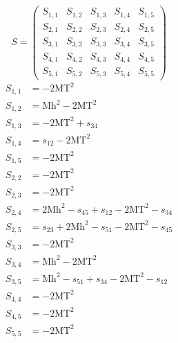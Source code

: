 \documentclass[a4paper]{article}
\begin{document}
\begin{equation}
S=\left(\begin{array}{ccccc}
   S_{1,1}&
   S_{1,2}&
   S_{1,3}&
   S_{1,4}&
   S_{1,5}\\
   S_{2,1}&
   S_{2,2}&
   S_{2,3}&
   S_{2,4}&
   S_{2,5}\\
   S_{3,1}&
   S_{3,2}&
   S_{3,3}&
   S_{3,4}&
   S_{3,5}\\
   S_{4,1}&
   S_{4,2}&
   S_{4,3}&
   S_{4,4}&
   S_{4,5}\\
   S_{5,1}&
   S_{5,2}&
   S_{5,3}&
   S_{5,4}&
   S_{5,5}\end{array}\right)
\end{equation}
\begin{subequations}
\begin{align}
   S_{1,1}&=-2\text{MT}^2\\
   S_{1,2}&=\text{Mh}^2-2\text{MT}^2\\
   S_{1,3}&=-2\text{MT}^2+s_{34}\\
   S_{1,4}&=s_{12}-2\text{MT}^2\\
   S_{1,5}&=-2\text{MT}^2\\
   S_{2,2}&=-2\text{MT}^2\\
   S_{2,3}&=-2\text{MT}^2\\
   S_{2,4}&=2\text{Mh}^2-s_{45}+s_{12}-2\text{MT}^2-s_{34}\\
   S_{2,5}&=s_{23}+2\text{Mh}^2-s_{51}-2\text{MT}^2-s_{45}\\
   S_{3,3}&=-2\text{MT}^2\\
   S_{3,4}&=\text{Mh}^2-2\text{MT}^2\\
   S_{3,5}&=\text{Mh}^2-s_{51}+s_{34}-2\text{MT}^2-s_{12}\\
   S_{4,4}&=-2\text{MT}^2\\
   S_{4,5}&=-2\text{MT}^2\\
   S_{5,5}&=-2\text{MT}^2
\end{align}
\end{subequations}
\end{document}
